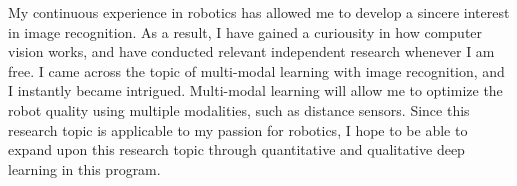 



%

My continuous experience in robotics 
has allowed me to develop a sincere interest in image recognition. 
As a result, I have gained a curiousity in how computer vision works, 
and have conducted relevant independent research whenever I am free. 
I came across the topic of multi-modal learning with image recognition, and I 
instantly became intrigued. Multi-modal learning will allow me to optimize the robot 
quality using multiple modalities, such as distance sensors. Since this research 
topic is applicable to my passion for robotics, I hope to be able to expand 
upon this research topic through quantitative and qualitative deep learning in this program.